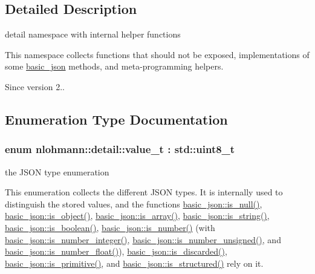 \subsection{Detailed Description}
detail namespace with internal helper functions 

This namespace collects functions that should not be exposed, implementations of some \hyperlink{classnlohmann_1_1basic__json}{basic\+\_\+json} methods, and meta-\/programming helpers.

\begin{DoxySince}{Since}
version 2.. 
\end{DoxySince}


\subsection{Enumeration Type Documentation}
\subsubsection[{\texorpdfstring{value\+\_\+t}{value_t}}]{\setlength{\rightskip}{0pt plus 5cm}enum {\bf nlohmann\+::detail\+::value\+\_\+t} \+: std\+::uint8\+\_\+t\hspace{0.3cm}{\ttfamily [strong]}}\hypertarget{namespacenlohmann_1_1detail_a1ed8fc6239da25abcaf681d30ace4985}{}\label{namespacenlohmann_1_1detail_a1ed8fc6239da25abcaf681d30ace4985}


the J\+S\+ON type enumeration 

This enumeration collects the different J\+S\+ON types. It is internally used to distinguish the stored values, and the functions \hyperlink{classnlohmann_1_1basic__json_a8faa039ca82427ed29c486ffd00600c3}{basic\+\_\+json\+::is\+\_\+null()}, \hyperlink{classnlohmann_1_1basic__json_af8f511af124e82e4579f444b4175787c}{basic\+\_\+json\+::is\+\_\+object()}, \hyperlink{classnlohmann_1_1basic__json_aef9ce5dd2381caee1f8ddcdb5bdd9c65}{basic\+\_\+json\+::is\+\_\+array()}, \hyperlink{classnlohmann_1_1basic__json_a69b596a4a6683b362095c9a139637396}{basic\+\_\+json\+::is\+\_\+string()}, \hyperlink{classnlohmann_1_1basic__json_a943e8cb182d0f2365c76d64b42eaa6fd}{basic\+\_\+json\+::is\+\_\+boolean()}, \hyperlink{classnlohmann_1_1basic__json_a2b9852390abb4b1ef5fac6984e2fc0f3}{basic\+\_\+json\+::is\+\_\+number()} (with \hyperlink{classnlohmann_1_1basic__json_abac8af76067f1e8fdca9052882c74428}{basic\+\_\+json\+::is\+\_\+number\+\_\+integer()}, \hyperlink{classnlohmann_1_1basic__json_abc7378cba0613a78b9aad1c8e7044bb0}{basic\+\_\+json\+::is\+\_\+number\+\_\+unsigned()}, and \hyperlink{classnlohmann_1_1basic__json_a33b4bf898b857c962e798fc7f6e86e70}{basic\+\_\+json\+::is\+\_\+number\+\_\+float()}), \hyperlink{classnlohmann_1_1basic__json_aabe623bc8304c2ba92d96d91f390fab4}{basic\+\_\+json\+::is\+\_\+discarded()}, \hyperlink{classnlohmann_1_1basic__json_a6362b88718eb5c6d4fed6a61eed44b95}{basic\+\_\+json\+::is\+\_\+primitive()}, and \hyperlink{classnlohmann_1_1basic__json_a9f68a0af820c3ced7f9d17851ce4c22d}{basic\+\_\+json\+::is\+\_\+structured()} rely on it.

